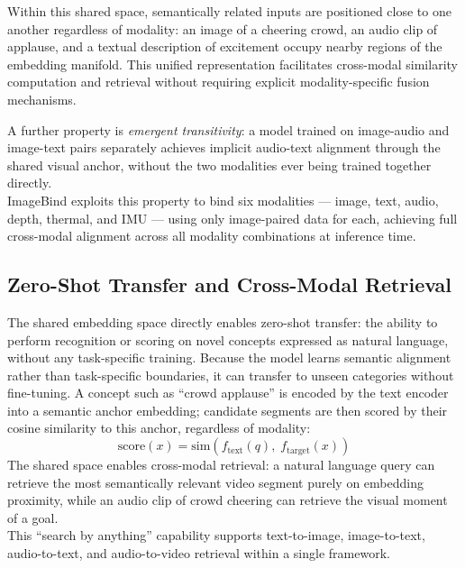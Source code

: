 \documentclass[12pt,a4paper,oneside,english]{book}
\begin{document}
Within this shared space, semantically related inputs are positioned close to one another regardless of modality: an image of a cheering crowd, an audio clip of applause, and a textual description of excitement occupy nearby regions of the embedding manifold. This unified representation facilitates cross-modal similarity computation and retrieval without requiring explicit modality-specific fusion mechanisms. 

A further property is \textit{emergent transitivity}: a model trained on image-audio and image-text pairs separately achieves implicit audio-text alignment through the shared visual anchor, without the two modalities ever being trained together directly. 
\\ImageBind \citep{girdhar2023imagebindembeddingspacebind} exploits this property to bind six modalities --- image, text, audio, depth, thermal, and IMU --- using only image-paired data for each, achieving full cross-modal alignment across all modality combinations at inference time.

\subsection{Zero-Shot Transfer and Cross-Modal Retrieval}
\label{subsec:zeroshot}
The shared embedding space directly enables zero-shot transfer: the ability to perform recognition or scoring on novel concepts expressed as natural language, without any task-specific training.  Because the model learns semantic alignment rather than task-specific boundaries, it can transfer to unseen categories without fine-tuning. A concept such as ``crowd applause'' is encoded by the text encoder into a semantic anchor embedding; candidate segments are then scored by their cosine similarity to this anchor, regardless of modality:
\begin{equation}
    \text{score}(x) = \text{sim}\!\left(f_{\text{text}}(q),\; f_{\text{target}}(x)\right)
\label{eq:zeroshot}
\end{equation}
The shared space enables cross-modal retrieval: a natural language query can retrieve the most semantically relevant video segment purely on embedding proximity, while an audio clip of crowd cheering can retrieve the visual moment of a goal.
\\This ``search by anything'' capability supports text-to-image, image-to-text, audio-to-text, and audio-to-video retrieval within a single framework.

\end{document}
